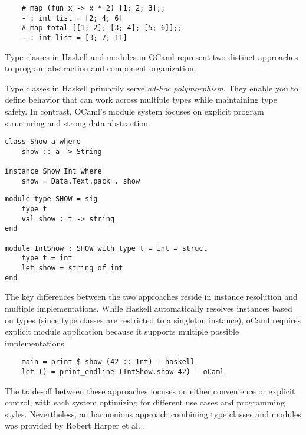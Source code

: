 \begin{lstlisting}
    # map (fun x -> x * 2) [1; 2; 3];;
    - : int list = [2; 4; 6]
    # map total [[1; 2]; [3; 4]; [5; 6]];;
    - : int list = [3; 7; 11]
\end{lstlisting}


Type classes in Haskell and modules in OCaml represent two distinct approaches to program abstraction and component organization. 

Type classes in Haskell primarily serve \textit{ad-hoc polymorphism}. They enable you to define behavior that can work across multiple types while maintaining type safety. 
In contrast, OCaml's module system focuses on explicit program structuring and strong data abstraction. 

\begin{lstlisting}
class Show a where
    show :: a -> String

instance Show Int where
    show = Data.Text.pack . show
\end{lstlisting}

\begin{lstlisting}
module type SHOW = sig
    type t
    val show : t -> string
end

module IntShow : SHOW with type t = int = struct
    type t = int
    let show = string_of_int
end
\end{lstlisting}

The key differences between the two approaches reside in instance resolution and multiple implementations. While Haskell automatically resolves instances based on types (since type classes are restricted to a singleton instance), oCaml requires explicit module application because it supports multiple possible implementations.

\begin{lstlisting}
    main = print $ show (42 :: Int) --haskell
    let () = print_endline (IntShow.show 42) --oCaml
\end{lstlisting}

The trade-off between these approaches focuses on either convenience or explicit control, with each system optimizing for different use cases and programming styles. Nevertheless, an harmonious approach combining type classes and modules was provided by Robert Harper et al. .

